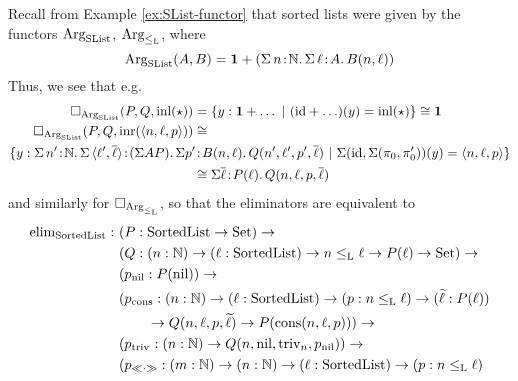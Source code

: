 \documentclass[orivec,envcountsame, ,envcountsect]{llncs}
\begin{document}
 \begin{example}
   Recall from Example \ref{ex:SList-functor} that sorted lists were given by the functors $\text{Arg}_{\text{SList}}$, $\text{Arg}_{\leq_{\text{L}}}$, where
\[ %
  \ArgSList(A, B) = \one + (\Sigma\, n\!:\!\Nat .\,\Sigma\,\ell\!:\!A.\, B(n,\ell))
\] %
   Thus, we see that e.g.\ 
   \begin{align*}
\BOX_{\ArgSList}(P, Q, \inl(\oneelt)) &=  
\{ y : \one + \ldots \ |\ (\id + \ldots)(y) = \inl(\oneelt) \} \cong \one \\
\BOX_{\ArgSList}(P, Q, \inr(\langle n, \ell, p\rangle)) &\cong \\
\{ y : \Sigma\, n'\!:\!\Nat .\,\Sigma\,\langle \ell', \overline{\ell}\rangle\!:\!(\Sigma A P).\, \Sigma p'\!&:\!B(n,\ell).\,Q(n', \ell', p', \overline{\ell})\ |\ \Sigma(\id, \Sigma(\pi_0, \pi'_0))(y) = \langle n, \ell, p\rangle\} \\
 & \cong \Sigma \overline{\ell}\!:\!P(\ell).\,Q(n, \ell, p, \overline{\ell})
   \end{align*}
   and similarly for $\Box_{\text{Arg}_{\leq_{\text{L}}}}$, so that the eliminators are equivalent to
   \begin{align*}
  \elim_{\SortedList} :\ & (P : \SortedList \to \Set) \to \\
                     & (Q : (n : \Nat) \to (\ell : \SortedList) \to n \lessList \ell \to P(\ell) \to \Set) \to \\
                     & (p_{\nilList} : P(\nilList)) \to \\
                     & (p_{\consListbare} : (n : \Nat) \to (\ell : \SortedList) \to (p : n \lessList \ell) \to (\stepind{\ell} : P(\ell)) \\
                     & \qquad \to Q(n, \ell, p, \stepind{\ell}) \to P(\consList{n}{\ell}{p})) \to \\
                     & (p_{\nilLess{}} : (n : \Nat) \to Q(n, \nilList, \nilLess{n}, p_{\nilList})) \to \\
                     & (p_{\consLessbare} : (m : \Nat) \to (n : \Nat) \to (\ell : \SortedList) \to (p : n \lessList \ell) \\

\end{align*}
\end{example}
\end{document}
